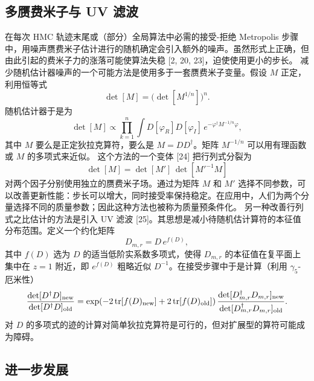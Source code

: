 \subsection{多赝费米子与 UV 滤波}

在每次 HMC 轨迹末尾或（部分）全局算法中必需的接受-拒绝 Metropolis 步骤中，用噪声赝费米子估计进行的随机确定会引入额外的噪声。虽然形式上正确，但由此引起的费米子力的涨落可能使算法失稳 [2, 20, 23]，迫使使用更小的步长。
减少随机估计器噪声的一个可能方法是使用多于一套赝费米子变量。假设 $M$ 正定，利用恒等式
\begin{equation}
\det[M] = \Big(\det[M^{1/n}]\Big)^n.
\end{equation}
随机估计器于是为
\begin{equation}
\det[M] \propto \prod_{k=1}^{n}\int D[\varphi_R]D[\varphi_I]\,e^{-\varphi^\dagger M^{-1/n}\varphi},
\end{equation}
其中 $M$ 要么是正定狄拉克算符，要么是 $M = DD^\dagger$。矩阵 $M^{-1/n}$ 可以用有理函数或 $M$ 的多项式来近似。
这个方法的一个变体 [24] 把行列式分裂为
\begin{equation}
\det[M] = \det[M']\,\det[M'^{-1}M]
\end{equation}
对两个因子分别使用独立的赝费米子场。通过为矩阵 $M$ 和 $M'$ 选择不同参数，可以改善更新性能：步长可以增大，同时接受率保持稳定。在应用中，人们为两个分量选择不同的质量参数；因此这种方法也被称为质量预条件化。
另一种改善行列式之比估计的方法是引入 UV 滤波 [25]。其思想是减小待随机估计算符的本征值分布范围。定义一个约化矩阵
\begin{equation}
D_{m,r} = D\,e^{f(D)},
\end{equation}
其中 $f(D)$ 选为 $D$ 的适当低阶实系数多项式，使得 $D_{m,r}$ 的本征值在复平面上集中在 $z = 1$ 附近，即 $e^{f(D)}$ 粗略近似 $D^{-1}$。在接受步骤中于是计算（利用 $\gamma_5$-厄米性）
\begin{equation}
\frac{\det[D^\dagger D]_{\mathrm{new}}}{\det[D^\dagger D]_{\mathrm{old}}}
= \exp(-2\operatorname{tr}[f(D)_{\mathrm{new}}] + 2\operatorname{tr}[f(D)_{\mathrm{old}}])\,
  \frac{\det[D_{m,r}^\dagger D_{m,r}]_{\mathrm{new}}}{\det[D_{m,r}^\dagger D_{m,r}]_{\mathrm{old}}}.
\end{equation}
对 $D$ 的多项式的迹的计算对简单狄拉克算符是可行的，但对扩展型的算符可能成为障碍。

\subsection{进一步发展}

